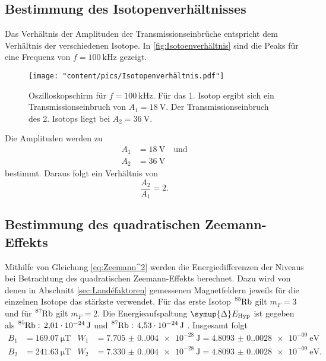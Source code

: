 \subsection{Bestimmung des Isotopenverhältnisses}
\label{sec:Isotoenverhältnis}
Das Verhältnis der Amplituden der Transmissionseinbrüche entspricht dem Verhältnis der verschiedenen Isotope. In \autoref{fig:Isotoenverhältnis} sind die Peaks
für eine Frequenz von $f=\qty{100}{\kilo\hertz}$ gezeigt.

\begin{figure}
  \centering
  \texttt{[image: "content/pics/Isotopenverhältnis.pdf"]}
  \caption{Oszilloskopschirm für $f=\qty{100}{\kilo\hertz}$. Für das 1. Isotop ergibt sich ein Transmissionseinbruch von $A_1=\qty{18}{\volt}$.
  Der Transmissionseinbruch des 2. Isotops liegt bei $A_2=\qty{36}{\volt}.$}
  \label{fig:Isotoenverhältnis}
\end{figure}
Die Amplituden werden zu 
\begin{align*}
  A_1 &= \qty{18}{\volt} \quad \text{und} \\
  A_2 &= \qty{36}{\volt}
\end{align*}
bestimmt. Daraus folgt ein Verhältnis von
\begin{equation*}
  \frac{A_2}{A_1} = \num{2}.
\end{equation*}

\subsection{Bestimmung des quadratischen Zeemann-Effekts}
Mithilfe von Gleichung \eqref{eq:Zeemann^2} werden die Energiedifferenzen der Niveaus bei Betrachtung des quadratischen Zeemann-Effekts berechnet. Dazu wird von
denen in Abschnitt \ref{sec:Landéfaktoren} gemessenen Magnetfeldern jeweils für die einzelnen Isotope das stärkste verwendet. Für das erste Isotop $\ce{^{85}Rb}$ gilt
$m_F=3$ und für $\ce{^{87}Rb}$ gilt $m_F=2$. Die Energieaufspaltung $\symup{\Delta}E_{\text{Hyp}}$ ist gegeben als $\ce{^{85}Rb}:\, \qty{2,01e-24}{\joule}$ und 
$\ce{^{87}Rb}:\, \qty{4,53e-24}{\joule}$ \cite{v21}. Insgesamt folgt
\begin{align*}
  B_1 &= \qty{169.07}{\micro\tesla} & W_1 &= \qty{7.705(0.004)e-28}{\joule} = \qty{4.8093(0.0028)e-09}{\electronvolt} \\
  B_2 &= \qty{241.63}{\micro\tesla} & W_2 &= \qty{7.330(0.004)e-28}{\joule} = \qty{4.8093(0.0028)e-09}{\electronvolt}. \\
\end{align*}


